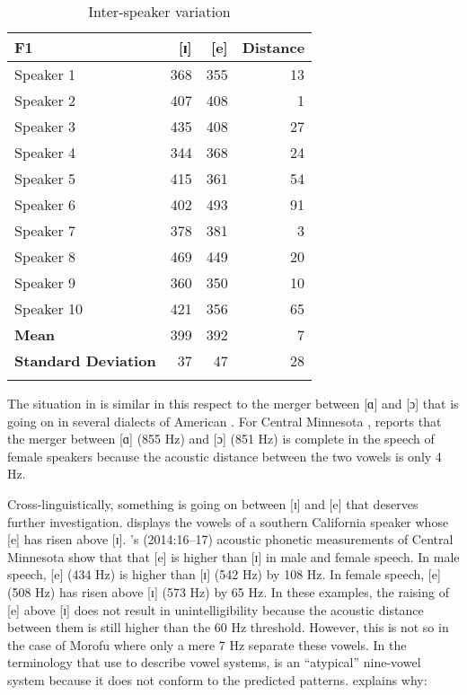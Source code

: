 \documentclass[output=paper,
modfonts
]{langscibook}
\begin{document}
\begin{table}
\caption{Inter-speaker variation}
\begin{tabularx}{.66\textwidth}{Xrrr}
\lsptoprule
 {\textbf{F1}} &  {[ɪ]} &  {[e]} &  {Distance}\\
\midrule
 {Speaker 1} &  {368} &  {355} &  {13}\\
 {Speaker 2} &  {407} &  {408} &  {1}\\
 {Speaker 3} &  {435} &  {408} &  {27}\\
 {Speaker 4} &  {344} &  {368} &  {24}\\
 {Speaker 5} &  {415} &  {361} &  {54}\\
 {Speaker 6} &  {402} &  {493} &  {91}\\
 {Speaker 7} &  {378} &  {381} &  {3}\\
 {Speaker 8} &  {469} &  {449} &  {20}\\
 {Speaker 9} &  {360} &  {350} &  {10}\\
 {Speaker 10} &  {421} &  {356} &  {65}\\
\midrule 
 {\textbf{Mean}} &  {399} &  {392} &  {7}\\
 {\textbf{Standard Deviation}} &  {37} &  {47} &  {28}\\
\lspbottomrule
\end{tabularx}
\label{tab:koffi:5}
\end{table}

{The situation in  is similar in this respect to the merger between [ɑ] and [ɔ] that is going on in several dialects of American . For Central Minnesota , \citet[5]{Koffi2013} reports that the merger between [ɑ] (855 Hz) and [ɔ] (851 Hz) is complete in the speech of female speakers because the acoustic distance between the two vowels is only 4 Hz.}

\largerpage
{Cross-linguistically, something is going on between [ɪ] and [e] that deserves further investigation. \citet[41--42]{Ladefoged1999} displays the vowels of a southern California speaker whose [e] has risen above [ɪ]. \citeauthor{Koffi2014}’s (2014:16--17) acoustic phonetic measurements of Central Minnesota  show that that [e] is higher than [ɪ] in male and female speech. In male speech, [e] (434 Hz) is higher than [ɪ] (542 Hz) by 108 Hz. In female speech, [e] (508 Hz) has risen above [ɪ] (573 Hz) by 65 Hz. In these examples, the raising of [e] above [ɪ] does not result in unintelligibility because the acoustic distance between them is still higher than the 60 Hz threshold. However, this is not so in the case of  Morofu where only a mere 7 Hz separate these vowels. In the terminology that \citet{SchwartzEtAl1997dispersion} use to describe vowel systems,  is an “atypical” nine-vowel system because it does not conform to the predicted patterns. \citet[169]{Becker-Kristal2010} explains why:} 
\end{document}
